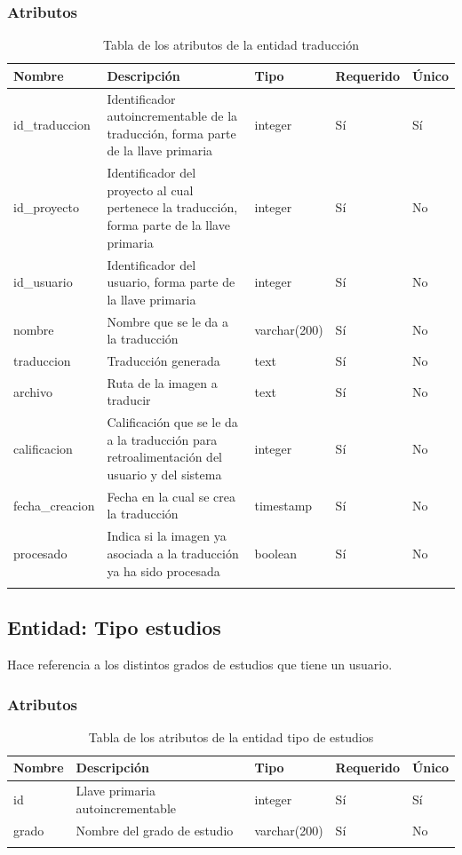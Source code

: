 \subsubsection{Atributos}
\begin{center}
	\begin{longtable}{|J{3cm}|J{4cm}|J{3cm}|J{2cm}|J{2cm}|}
		\hline
		\textbf{Nombre} & \textbf{Descripción} & \textbf{Tipo} & \textbf{Requerido} & \textbf{Único} \\ \hline
		id\_traduccion & Identificador autoincrementable de la traducción, forma parte de la llave primaria & integer & Sí & Sí \\ \hline
		id\_proyecto & Identificador del proyecto al cual pertenece la traducción, forma parte de la llave primaria & integer & Sí & No \\ \hline
		id\_usuario & Identificador del usuario, forma parte de la llave primaria & integer & Sí & No \\ \hline
		nombre & Nombre que se le da a la traducción & varchar(200) & Sí & No \\ \hline
		traduccion & Traducción generada & text & Sí & No \\ \hline
		archivo & Ruta de la imagen a traducir & text & Sí & No \\ \hline
		calificacion & Calificación que se le da a la traducción para retroalimentación del usuario y del sistema & integer & Sí & No\\ \hline
		fecha\_creacion & Fecha en la cual se crea la traducción & timestamp & Sí & No \\ \hline
		procesado & Indica si la imagen ya asociada a la traducción ya ha sido procesada & boolean & Sí & No\\ \hline
		\caption{Tabla de los atributos de la entidad traducción}
		\label{tbl:entidad-traduccion}
	\end{longtable}
\end{center}
\subsection{Entidad: Tipo estudios}
Hace referencia a los distintos grados de estudios que tiene un usuario.
\subsubsection{Atributos}
\begin{center}
	\begin{longtable}{|J{3cm}|J{4cm}|J{3cm}|J{2cm}|J{2cm}|}
		\hline
		\textbf{Nombre} & \textbf{Descripción} & \textbf{Tipo} & \textbf{Requerido} & \textbf{Único} \\ \hline
		id & Llave primaria autoincrementable & integer & Sí & Sí \\ \hline
		grado & Nombre del grado de estudio & varchar(200) & Sí & No \\ \hline
		\caption{Tabla de los atributos de la entidad tipo de estudios}
		\label{tbl:entidad-tipo-estudios}
	\end{longtable}
\end{center}
